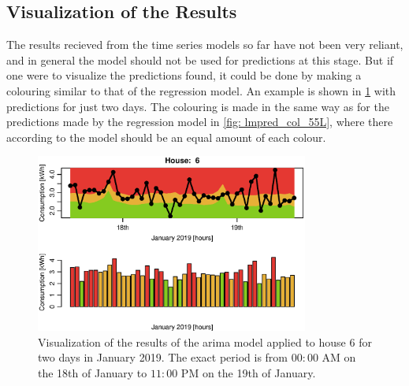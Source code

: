 \subsection{Visualization of the Results}

\noindent The results recieved from the time series models so far have not been very reliant, and in general the model should not be used for predictions at this stage. But if one were to visualize the predictions found, it could be done by making a colouring similar to that of the regression model. An example is shown in \cref{fig:app6} with predictions for just two days. The colouring is made in the same way as for the predictions made by the regression model in \cref{fig: lmpred_col_55L}, where there according to the model should be an equal amount of each colour.

\begin{figure}
    \centering
    \includegraphics[width=0.8\textwidth]{../../../figures/AppHour6.eps}
    \caption{Visualization of the results of the arima model applied to house 6 for two days in January 2019. The exact period is from $00:00$ AM on the 18th of January to $11:00$ PM on the 19th of January.}
    \label{fig:app6}
\end{figure}



